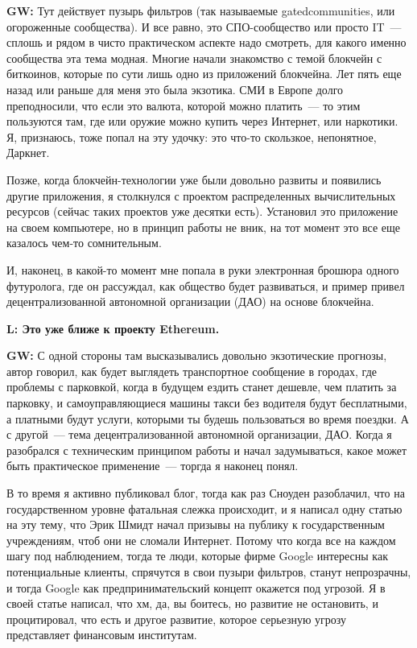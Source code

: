 \documentclass[10pt, a5paper]{article}
\begin{document}
\begin{Parallel}[p]{}{}
{{\noindent \bf GW:} Тут действует пузырь фильтров (так называемые gated\linebreak communities, или огороженные сообщества). И все равно, это СПО-сообщество или просто IT~--- сплошь и рядом в чисто практическом аспекте надо смотреть, для какого именно сообщества эта тема модная.  Многие начали знакомство с темой блокчейн  с биткоинов, которые по сути лишь одно из приложений блокчейна. Лет пять еще назад или раньше для меня это была экзотика. СМИ в Европе долго преподносили, что если это валюта, которой можно платить~--- то этим пользуются там, где или оружие можно купить через Интернет, или наркотики. Я, признаюсь, тоже попал на эту удочку: это что-то скользкое, непонятное, Даркнет. 

Позже, когда блокчейн-технологии уже были довольно развиты и появились другие приложения, я столкнулся с проектом распределенных вычислительных ресурсов (сейчас таких проектов уже десятки есть). Установил это приложение на своем компьютере, но в принцип работы не вник, на тот момент это все еще казалось чем-то сомнительным.  

И, наконец, в какой-то момент мне попала в руки электронная брошюра одного футуролога, где он рассуждал, как общество будет развиваться, и пример привел  децентрализованной автономной организации (ДАО) на основе блокчейна. 

{\noindent \bf L: Это уже ближе к проекту Ethereum. }

{\noindent \bf GW:} С одной стороны там высказывались довольно экзотические прогнозы, автор говорил, как будет выглядеть транспортное сообщение в городах, где проблемы с парковкой, когда в будущем ездить станет дешевле, чем платить за парковку, и самоуправляющиеся машины такси без водителя будут бесплатными, а платными будут услуги, которыми ты будешь пользоваться во время поездки. А с другой~--- тема децентрализованной автономной организации, ДАО. Когда я разобрался с техническим принципом работы и начал задумываться, какое может быть практическое применение~--- торгда я наконец понял. 

В то время я активно публиковал блог, тогда как раз Сноуден разоблачил, что на государственном уровне фатальная слежка происходит, и я написал одну статью на эту тему, что Эрик Шмидт начал призывы на публику к государственным учреждениям, чтоб они не сломали Интернет. Потому что когда все на каждом шагу под наблюдением, тогда те люди, которые фирме Google интересны как потенциальные клиенты, спрячутся в свои пузыри фильтров, станут непрозрачны, и тогда Google как предпринимательский концепт окажется под угрозой. Я в своей статье написал, что хм, да, вы боитесь, но развитие не остановить, и процитировал, что есть и другое развитие, которое серьезную угрозу представляет финансовым институтам.

}
\end{Parallel}
\end{document}
